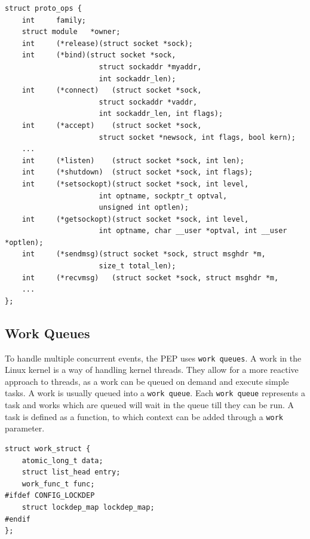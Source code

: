 \documentclass[a4paper,english, 11pt]{report}
\begin{document}
\noindent\begin{minipage}{\linewidth}
\begin{verbatim}
struct proto_ops {
    int		family;
    struct module	*owner;
    int		(*release)(struct socket *sock);
    int		(*bind)(struct socket *sock,
    			      struct sockaddr *myaddr,
    			      int sockaddr_len);
    int		(*connect)   (struct socket *sock,
    			      struct sockaddr *vaddr,
    			      int sockaddr_len, int flags);
    int		(*accept)    (struct socket *sock,
    			      struct socket *newsock, int flags, bool kern);
    ...
    int		(*listen)    (struct socket *sock, int len);
    int		(*shutdown)  (struct socket *sock, int flags);
    int		(*setsockopt)(struct socket *sock, int level,
    			      int optname, sockptr_t optval,
    			      unsigned int optlen);
    int		(*getsockopt)(struct socket *sock, int level,
    			      int optname, char __user *optval, int __user *optlen);
    int		(*sendmsg)(struct socket *sock, struct msghdr *m,
    			      size_t total_len);
    int		(*recvmsg)   (struct socket *sock, struct msghdr *m,
    ...
};
\end{verbatim}
\label{fig:proto_ops}
\end{minipage}

\subsection{Work Queues}
To handle multiple concurrent events, the PEP uses \verb|work queues|. A work in the Linux kernel is a way of handling kernel threads. They allow for a more reactive approach to threads, as a work can be queued on demand and execute simple tasks. A work is usually queued into a \verb|work queue|. Each \verb|work queue| represents a task and works which are queued will wait in the queue till they can be run. A task is defined as a function, to which context can be added through a \verb|work| parameter.\\

\noindent\begin{minipage}{\linewidth}
\begin{verbatim}
struct work_struct {
    atomic_long_t data;
    struct list_head entry;
    work_func_t func;
#ifdef CONFIG_LOCKDEP
    struct lockdep_map lockdep_map;
#endif
};
\end{verbatim}
\label{fig:work_struct}
\end{minipage}
\end{document}
